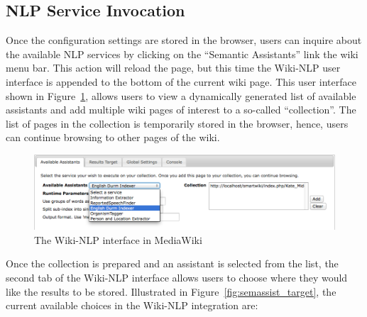 \subsection{NLP Service Invocation}
Once the configuration settings are stored in the browser, users can inquire about the available NLP services by clicking on the ``Semantic Assistants'' link the wiki menu bar. This action will reload the page, but this time the Wiki-NLP user interface is appended to the bottom of the current wiki page. This user interface shown in Figure~\ref{fig:semassist_ui}, allows users to view a dynamically generated list of available assistants and add multiple wiki pages of interest to a so-called ``collection''. The list of pages in the collection is temporarily stored in the browser, hence, users can continue browsing to other pages of the wiki.

\begin{figure}
\centering
\includegraphics[width=\textwidth]{pictures/semassist_ui.png}
\caption{The Wiki-NLP interface in MediaWiki}
\label{fig:semassist_ui}
\end{figure}

\blankline
Once the collection is prepared and an assistant is selected from the list, the second tab of the Wiki-NLP interface allows users to choose where they would like the results to be stored. Illustrated in Figure~\ref{fig:semassist_target}, the current available choices in the Wiki-NLP integration are:

